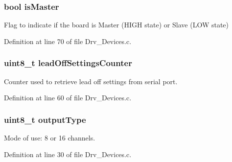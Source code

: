 \subsubsection[{\texorpdfstring{is\+Master}{isMaster}}]{\setlength{\rightskip}{0pt plus 5cm}bool is\+Master}\hypertarget{group__Devices__Library_ga6ceb9b5a0a67762763468c0ac71705fe}{}\label{group__Devices__Library_ga6ceb9b5a0a67762763468c0ac71705fe}


Flag to indicate if the board is Master (H\+I\+GH state) or Slave (L\+OW state) 



Definition at line 70 of file Drv\+\_\+\+Devices.\+c.

\subsubsection[{\texorpdfstring{lead\+Off\+Settings\+Counter}{leadOffSettingsCounter}}]{\setlength{\rightskip}{0pt plus 5cm}uint8\+\_\+t lead\+Off\+Settings\+Counter}\hypertarget{group__Devices__Library_gacaa36aec7dee3c3535b27afc88dcfc9c}{}\label{group__Devices__Library_gacaa36aec7dee3c3535b27afc88dcfc9c}


Counter used to retrieve lead off settings from serial port. 



Definition at line 60 of file Drv\+\_\+\+Devices.\+c.

\subsubsection[{\texorpdfstring{output\+Type}{outputType}}]{\setlength{\rightskip}{0pt plus 5cm}uint8\+\_\+t output\+Type}\hypertarget{group__Devices__Library_ga2bc20b2f7f3efa988afcd5c19b3e2edf}{}\label{group__Devices__Library_ga2bc20b2f7f3efa988afcd5c19b3e2edf}


Mode of use\+: 8 or 16 channels. 



Definition at line 30 of file Drv\+\_\+\+Devices.\+c.

